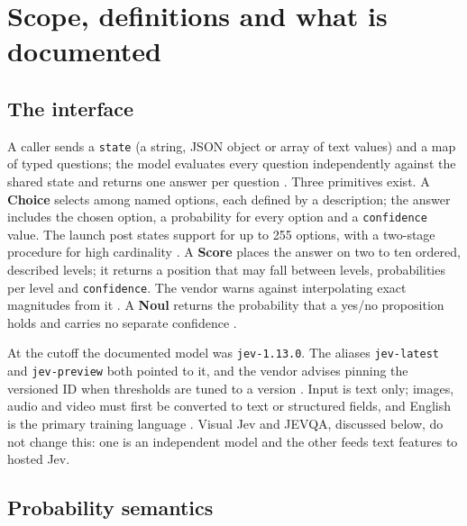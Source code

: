 \section{Scope, definitions and what is documented}\label{sec:scope-definitions-and-what-is-documented}

\subsection{The interface}

A caller sends a \texttt{state} (a string, JSON object or array of text values) and a map of typed questions; the model evaluates every question independently against the shared state and returns one answer per question \citep{typesafe2026state,typesafe2026primitives}. Three primitives exist. A \textbf{Choice} selects among named options, each defined by a description; the answer includes the chosen option, a probability for every option and a \texttt{confidence} value. The launch post states support for up to 255 options, with a two-stage procedure for high cardinality \citep{typesafe2026launch}. A \textbf{Score} places the answer on two to ten ordered, described levels; it returns a position that may fall between levels, probabilities per level and \texttt{confidence}. The vendor warns against interpolating exact magnitudes from it \citep{typesafe2026jaggedness}. A \textbf{Noul} returns the probability that a yes/no proposition holds and carries no separate confidence \citep{typesafe2026primitives,typesafe2026confidence}.

At the cutoff the documented model was \texttt{jev-1.13.0}. The aliases \texttt{jev-latest} and \texttt{jev-preview} both pointed to it, and the vendor advises pinning the versioned ID when thresholds are tuned to a version \citep{typesafe2026models}. Input is text only; images, audio and video must first be converted to text or structured fields, and English is the primary training language \citep{typesafe2026models,typesafe2026state}. Visual Jev and JEVQA, discussed below, do not change this: one is an independent model and the other feeds text features to hosted Jev.

\subsection{Probability semantics}

